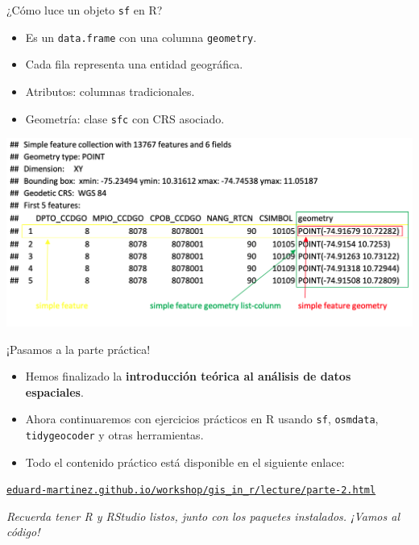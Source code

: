\documentclass{beamer}
\begin{document}
\begin{frame}{¿Cómo luce un objeto \texttt{sf} en R?}
\begin{itemize}
    \item Es un \texttt{data.frame} con una columna \texttt{geometry}.
    \item Cada fila representa una entidad geográfica.
    \item Atributos: columnas tradicionales.
    \item Geometría: clase \texttt{sfc} con CRS asociado.
\end{itemize}
\centering
\includegraphics[width=0.95\linewidth]{figures/sf_console.png}
\end{frame}

\begin{frame}{¡Pasamos a la parte práctica!}
\vspace{1em}
\begin{itemize}
    \item Hemos finalizado la \textbf{introducción teórica al análisis de datos espaciales}.
    \item Ahora continuaremos con ejercicios prácticos en R usando \texttt{sf}, \texttt{osmdata}, \texttt{tidygeocoder} y otras herramientas.
    \item Todo el contenido práctico está disponible en el siguiente enlace:
\end{itemize}
\vspace{1.5em}
\begin{center}
\Large
\href{https://eduard-martinez.github.io/workshop/gis_in_r/lecture/parte-2.html}{\texttt{eduard-martinez.github.io/workshop/gis\_in\_r/lecture/parte-2.html}}
\end{center}
\vspace{1em}
\small
\textit{Recuerda tener R y RStudio listos, junto con los paquetes instalados. ¡Vamos al código!}
\end{frame}
\end{document}
